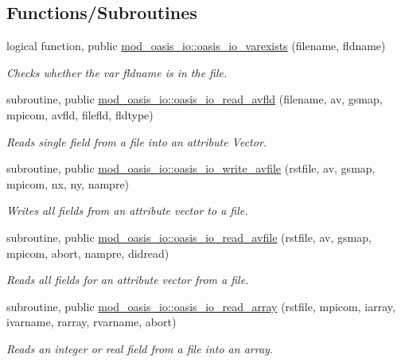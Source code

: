 \subsection*{Functions/\+Subroutines}
\begin{DoxyCompactItemize}
\item 
logical function, public \hyperlink{namespacemod__oasis__io_a4d0f5cb29eabc798e857127c8c174d85}{mod\+\_\+oasis\+\_\+io\+::oasis\+\_\+io\+\_\+varexists} (filename, fldname)
\begin{DoxyCompactList}\small\item\em Checks whether the var fldname is in the file. \end{DoxyCompactList}\item 
subroutine, public \hyperlink{namespacemod__oasis__io_a6c14bebb7b216218e25f599e3469ae0c}{mod\+\_\+oasis\+\_\+io\+::oasis\+\_\+io\+\_\+read\+\_\+avfld} (filename, av, gsmap, mpicom, avfld, filefld, fldtype)
\begin{DoxyCompactList}\small\item\em Reads single field from a file into an attribute Vector. \end{DoxyCompactList}\item 
subroutine, public \hyperlink{namespacemod__oasis__io_ad8a48d6c36e3fac637a8191c20e514f2}{mod\+\_\+oasis\+\_\+io\+::oasis\+\_\+io\+\_\+write\+\_\+avfile} (rstfile, av, gsmap, mpicom, nx, ny, nampre)
\begin{DoxyCompactList}\small\item\em Writes all fields from an attribute vector to a file. \end{DoxyCompactList}\item 
subroutine, public \hyperlink{namespacemod__oasis__io_a65e17e4a065e8e4dea33754fb9c1d32c}{mod\+\_\+oasis\+\_\+io\+::oasis\+\_\+io\+\_\+read\+\_\+avfile} (rstfile, av, gsmap, mpicom, abort, nampre, didread)
\begin{DoxyCompactList}\small\item\em Reads all fields for an attribute vector from a file. \end{DoxyCompactList}\item 
subroutine, public \hyperlink{namespacemod__oasis__io_a8b604f89345d74c74c6bc3b4760b2e29}{mod\+\_\+oasis\+\_\+io\+::oasis\+\_\+io\+\_\+read\+\_\+array} (rstfile, mpicom, iarray, ivarname, rarray, rvarname, abort)
\begin{DoxyCompactList}\small\item\em Reads an integer or real field from a file into an array. \end{DoxyCompactList}\item 

\end{DoxyCompactItemize}
